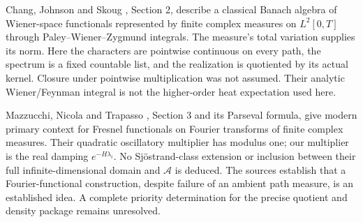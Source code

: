 \documentclass[11pt]{article}
\theoremstyle{remark}\newtheorem{remark}[theorem]{Remark}
\newcommand{\A}{\mathcal A}\newcommand{\X}{\mathcal X}
\begin{document}
Chang, Johnson and Skoug \cite{cjs}, Section 2, describe a classical Banach algebra of Wiener-space functionals represented by finite complex measures on $L^2[0,T]$ through Paley--Wiener--Zygmund integrals. The measure's total variation supplies its norm. Here the characters are pointwise continuous on every path, the spectrum is a fixed countable list, and the realization is quotiented by its actual kernel. Closure under pointwise multiplication was not assumed. Their analytic Wiener/Feynman integral is not the higher-order heat expectation used here.

Mazzucchi, Nicola and Trapasso \cite{mnt}, Section 3 and its Parseval formula, give modern primary context for Fresnel functionals on Fourier transforms of finite complex measures. Their quadratic oscillatory multiplier has modulus one; our multiplier is the real damping $e^{-H\lambda_i}$. No Sj\"ostrand-class extension or inclusion between their full infinite-dimensional domain and $\A$ is deduced. The sources establish that a Fourier-functional construction, despite failure of an ambient path measure, is an established idea. A complete priority determination for the precise quotient and density package remains unresolved.
\end{document}
